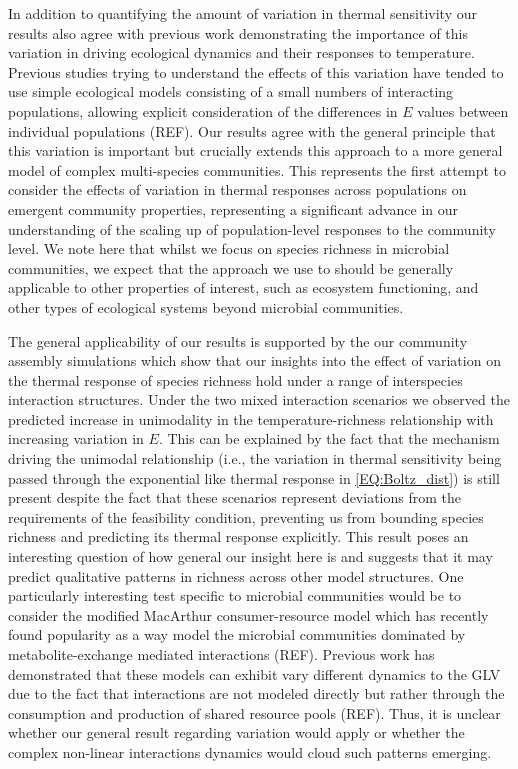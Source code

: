 \documentclass{article}
\begin{document}
In addition to quantifying the amount of variation in thermal sensitivity our results also agree with previous work demonstrating the importance of this variation in driving ecological dynamics and their responses to temperature. Previous studies trying to understand the effects of this variation have tended to use simple ecological models consisting of a small numbers of interacting populations, allowing explicit consideration of the differences in $E$ values between individual populations (REF). Our results agree with the general principle that this variation is important but crucially extends this approach to a more general model of complex multi-species communities. This represents the first attempt to consider the effects of variation in thermal responses across populations on emergent community properties, representing a significant advance in our understanding of the scaling up of population-level responses to the community level. We note here that whilst we focus on species richness in microbial communities, we expect that the approach we use to should be generally applicable to other properties of interest, such as ecosystem functioning, and other types of ecological systems beyond microbial communities. 

The general applicability of our results is supported by the our community assembly simulations which show that our insights into the effect of variation on the thermal response of species richness hold under a range of interspecies interaction structures. Under the two mixed interaction scenarios we observed the predicted increase in unimodality in the temperature-richness relationship with increasing variation in $E$. This can be explained by the fact that the mechanism driving the unimodal relationship (i.e., the variation  in thermal sensitivity being passed through the exponential like thermal response in \cref{EQ:Boltz_dist}) is still present despite the fact that these scenarios represent deviations from the requirements of the feasibility condition, preventing us from bounding species richness and predicting its thermal response explicitly. This result poses an interesting question of how general our insight here is and suggests that it may predict qualitative patterns in richness across other model structures. One particularly interesting test specific to microbial communities would be to consider the modified MacArthur consumer-resource model which has recently found popularity as a way model the microbial communities dominated by metabolite-exchange mediated interactions (REF). Previous work has demonstrated that these models can exhibit vary different dynamics to the GLV due to the fact that interactions are not modeled directly but rather through the consumption and production of shared resource pools (REF). Thus, it is unclear whether our general result regarding variation would apply or whether the complex non-linear interactions dynamics would cloud such patterns emerging. 
\end{document}
